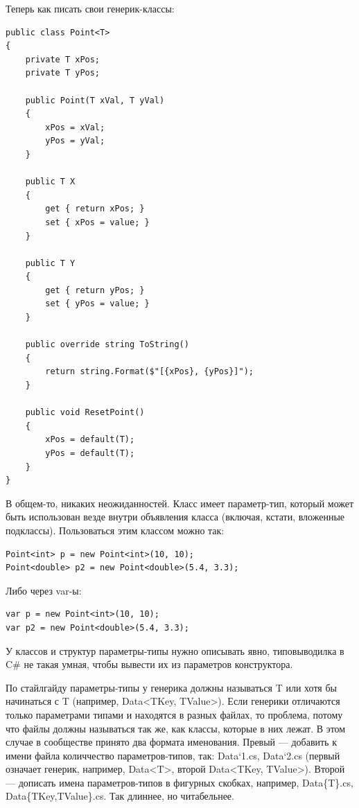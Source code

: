 \documentclass[a5paper]{article}
\begin{document}
Теперь как писать свои генерик-классы:

\begin{verbatim}
public class Point<T>
{
    private T xPos;
    private T yPos;

    public Point(T xVal, T yVal)
    {
        xPos = xVal;
        yPos = yVal;
    }

    public T X
    {
        get { return xPos; }
        set { xPos = value; }
    }

    public T Y
    {
        get { return yPos; }
        set { yPos = value; }
    }

    public override string ToString()
    {
        return string.Format($"[{xPos}, {yPos}]");
    }

    public void ResetPoint()
    {
        xPos = default(T);
        yPos = default(T);
    }
}
\end{verbatim}

В общем-то, никаких неожиданностей. Класс имеет параметр-тип, который может быть использован везде внутри объявления класса (включая, кстати, вложенные подклассы). Пользоваться этим классом можно так:

\begin{verbatim}
Point<int> p = new Point<int>(10, 10);
Point<double> p2 = new Point<double>(5.4, 3.3);
\end{verbatim}

Либо через var-ы:

\begin{verbatim}
var p = new Point<int>(10, 10);
var p2 = new Point<double>(5.4, 3.3);
\end{verbatim}

У классов и структур параметры-типы нужно описывать явно, типовыводилка в C\# не такая умная, чтобы вывести их из параметров конструктора.

По стайлгайду параметры-типы у генерика должны называться T или хотя бы начинаться с T (например, Data<TKey, TValue>). Если генерики отличаются только параметрами типами и находятся в разных файлах, то проблема, потому что файлы должны называться так же, как классы, которые в них лежат. В этом случае в сообществе принято два формата именования. Превый --- добавить к имени файла количчество параметров-типов, так: Data‘1.cs, Data‘2.cs (первый означает генерик, например, Data<T>, второй Data<TKey, TValue>). Второй --- дописать имена параметров-типов в фигурных скобках, например, Data\{T\}.cs, Data\{TKey,TValue\}.cs. Так длиннее, но читабельнее.
\end{document}
